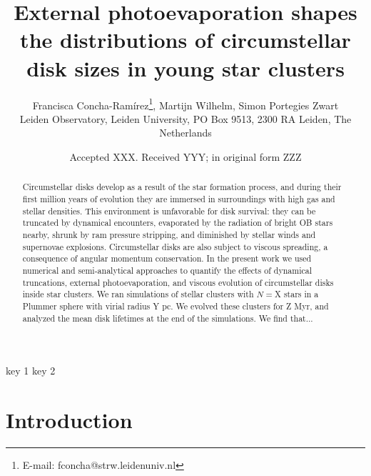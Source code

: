 \documentclass[fleqn,usenatbib]{mnras}
\title[External photoevaporation of disks in young star clusters]{External photoevaporation shapes the distributions of circumstellar disk sizes in young star clusters}
\author[Concha-Ramírez et al.]{
Francisca Concha-Ramírez\thanks{E-mail: fconcha@strw.leidenuniv.nl},
Martijn Wilhelm,
Simon Portegies Zwart
\\
Leiden Observatory, Leiden University, PO Box 9513, 2300 RA Leiden, The Netherlands\\
}
\date{Accepted XXX. Received YYY; in original form ZZZ}
\newcommand\note[1]{{\colorbox{yellow!60}{\color{magenta}#1}}}
\begin{document}
\label{firstpage}
\pagerange{\pageref{firstpage}--\pageref{lastpage}}
\maketitle

\begin{abstract}
Circumstellar disks develop as a result of the star formation process, and during their first million years of evolution they are immersed in surroundings with high gas and stellar densities. This environment is unfavorable for disk survival: they can be truncated by dynamical encounters, evaporated by the radiation of bright OB stars nearby, shrunk by ram pressure stripping, and diminished by stellar winds and supernovae explosions. Circumstellar disks are also subject to viscous spreading, a consequence of angular momentum conservation. In the present work we used numerical and semi-analytical approaches to quantify the effects of dynamical truncations, external photoevaporation, and viscous evolution of circumstellar disks inside star clusters. We ran simulations of stellar clusters with $N=$\note{X} stars in a Plummer sphere with virial radius \note{Y pc}. We evolved these clusters for \note{Z} Myr, and analyzed the mean disk lifetimes at the end of the simulations. \note{We find that...}
\end{abstract}

\begin{keywords}
key 1 key 2
\end{keywords}

\section{Introduction}
\label{sec:introduction}
\end{document}

